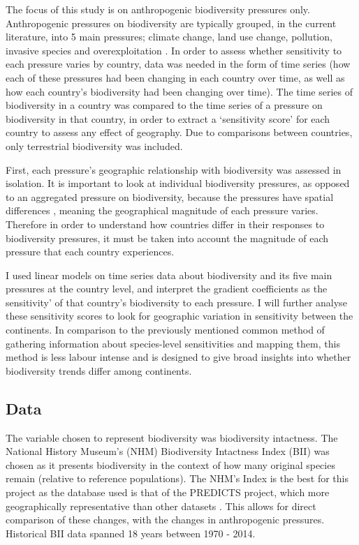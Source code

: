 \documentclass[11pt, a4paper, titlepage]{article}
\begin{document}
	The focus of this study is on anthropogenic biodiversity pressures only. Anthropogenic pressures on biodiversity are typically grouped, in the current literature, into 5 main pressures; climate change, land use change, pollution, invasive species and overexploitation \citep{watson2019summary}. In order to assess whether sensitivity to each pressure varies by country, data was needed in the form of time series (how each of these pressures had been changing in each country over time, as well as how each country's biodiversity had been changing over time). The time series of biodiversity in a country was compared to the time series of a pressure on biodiversity in that country, in order to extract a `sensitivity score' for each country to assess any effect of geography. Due to comparisons between countries, only terrestrial biodiversity was included. \newline
	
	First, each pressure's geographic relationship with biodiversity was assessed in isolation. It is important to look at individual biodiversity pressures, as opposed to an aggregated pressure on biodiversity, because the pressures have spatial differences \citep{steffen2015planetary}, meaning the geographical magnitude of each pressure varies. Therefore in order to understand how countries differ in their responses to biodiversity pressures, it must be taken into account the magnitude of each pressure that each country experiences. \newline
	
	I used linear models on time series data about biodiversity and its five main pressures at the country level, and interpret the gradient coefficients as the sensitivity' of that country's biodiversity to each pressure. I will further analyse these sensitivity scores to look for geographic variation in sensitivity between the continents. In comparison to the previously mentioned common method of gathering information about species-level sensitivities and mapping them, this method is less labour intense and is designed to give broad insights into whether biodiversity trends differ among continents. \newline
	\subsection*{Data}
	
	The variable chosen to represent biodiversity was biodiversity intactness. The National History Museum's (NHM) Biodiversity Intactness Index (BII)\citep{phillips2021} was chosen as it presents biodiversity in the context of how many original species remain (relative to reference populations). The NHM's Index is the best for this project as the database used is that of the PREDICTS project, which more geographically representative than other datasets \citep{purvis2018modelling}. This allows for direct comparison of these changes, with the changes in anthropogenic pressures. Historical BII data spanned 18 years between 1970 - 2014. \newline
	
\end{document}
